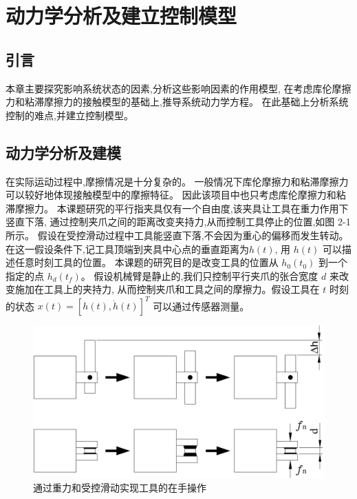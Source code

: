 \chapter{动力学分析及建立控制模型}

\section{引言}
本章主要探究影响系统状态的因素,分析这些影响因素的作用模型,
在考虑库伦摩擦力和粘滞摩擦力的接触模型的基础上,推导系统动力学方程。
在此基础上分析系统控制的难点,并建立控制模型。

\section{动力学分析及建模}

在实际运动过程中,摩擦情况是十分复杂的。
一般情况下库伦摩擦力和粘滞摩擦力可以较好地体现接触模型中的摩擦特征。
因此该项目中也只考虑库伦摩擦力和粘滞摩擦力。
本课题研究的平行指夹具仅有一个自由度,该夹具让工具在重力作用下竖直下落,
通过控制夹爪之间的距离改变夹持力,从而控制工具停止的位置,如图 2-1 所示。
假设在受控滑动过程中工具能竖直下落,不会因为重心的偏移而发生转动。
在这一假设条件下,记工具顶端到夹具中心点的垂直距离为$h(t)$,
用 $h(t)$ 可以描述任意时刻工具的位置。
本课题的研究目的是改变工具的位置从 ${h_0}({t_0})$ 到一个指定的点 ${h_d}({t_f})$。
假设机械臂是静止的,我们只控制平行夹爪的张合宽度 $d$ 来改变施加在工具上的夹持力,
从而控制夹爪和工具之间的摩擦力。假设工具在 $t$ 时刻的状态 $x(t) = {\left[ {h(t),\dot h(t)} \right]^T}$ 可以通过传感器测量。

\begin{figure}[!ht]
  \centering
  \includegraphics[scale=0.45]{chapter02/pic/2-1}
  \caption{通过重力和受控滑动实现工具的在手操作}
  \label{fig:2-1}
  \vspace{-0.3cm}
\end{figure}


